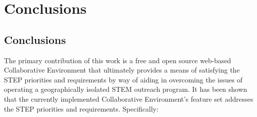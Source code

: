 \chapter{Conclusions}
\label{chap:conclusion}

\section{Conclusions}
The primary contribution of this work is a free and open source web-based Collaborative Environment that ultimately provides a means of satisfying the STEP priorities and requirements by way of aiding in overcoming the issues of operating a geographically isolated STEM outreach program. It has been shown that the currently implemented Collaborative Environment's feature set addresses the STEP priorities and requirements. Specifically:

